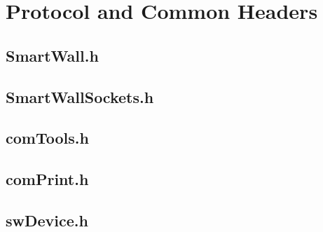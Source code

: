 \documentclass[11pt]{article}
\begin{document}


\pagebreak

\section{Protocol and Common Headers}
\label{sec:ProtocolHeaders}

\pagebreak

\subsection{SmartWall.h}
\label{sec:ProtocolHeaders.SmartWall.h}


\pagebreak

\subsection{SmartWallSockets.h}
\label{sec:ProtocolHeaders.SmartWallSockets.h}


\pagebreak

\subsection{comTools.h}
\label{sec:ProtocolHeaders.comTools.h}


\pagebreak

\subsection{comPrint.h}
\label{sec:ProtocolHeaders.comPrint.h}


\pagebreak

\subsection{swDevice.h}
\label{sec:ProtocolHeaders.swDevice.h}

\end{document}
